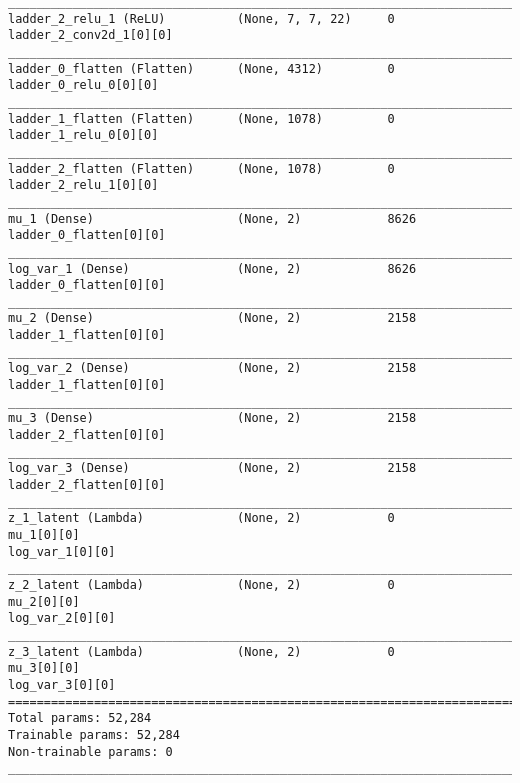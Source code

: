 \begin{lstlisting}[caption={\ac{VLAE} network encoder used for network sparsity experiments with one third the number of feature maps},captionpos=b,basicstyle=\tiny, label={lst:sparsity-vlae-encoder-28-fm3}]
__________________________________________________________________________________________________
ladder_2_relu_1 (ReLU)          (None, 7, 7, 22)     0           ladder_2_conv2d_1[0][0]
__________________________________________________________________________________________________
ladder_0_flatten (Flatten)      (None, 4312)         0           ladder_0_relu_0[0][0]
__________________________________________________________________________________________________
ladder_1_flatten (Flatten)      (None, 1078)         0           ladder_1_relu_0[0][0]
__________________________________________________________________________________________________
ladder_2_flatten (Flatten)      (None, 1078)         0           ladder_2_relu_1[0][0]
__________________________________________________________________________________________________
mu_1 (Dense)                    (None, 2)            8626        ladder_0_flatten[0][0]
__________________________________________________________________________________________________
log_var_1 (Dense)               (None, 2)            8626        ladder_0_flatten[0][0]
__________________________________________________________________________________________________
mu_2 (Dense)                    (None, 2)            2158        ladder_1_flatten[0][0]
__________________________________________________________________________________________________
log_var_2 (Dense)               (None, 2)            2158        ladder_1_flatten[0][0]
__________________________________________________________________________________________________
mu_3 (Dense)                    (None, 2)            2158        ladder_2_flatten[0][0]
__________________________________________________________________________________________________
log_var_3 (Dense)               (None, 2)            2158        ladder_2_flatten[0][0]
__________________________________________________________________________________________________
z_1_latent (Lambda)             (None, 2)            0           mu_1[0][0]
log_var_1[0][0]
__________________________________________________________________________________________________
z_2_latent (Lambda)             (None, 2)            0           mu_2[0][0]
log_var_2[0][0]
__________________________________________________________________________________________________
z_3_latent (Lambda)             (None, 2)            0           mu_3[0][0]
log_var_3[0][0]
==================================================================================================
Total params: 52,284
Trainable params: 52,284
Non-trainable params: 0
__________________________________________________________________________________________________
\end{lstlisting}